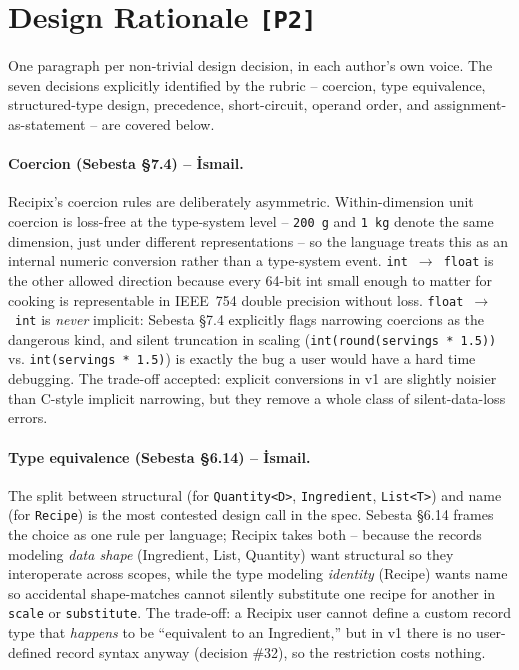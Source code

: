 \documentclass[11pt,a4paper]{article}
\begin{document}
\section{Design Rationale \texttt{[P2]}}

One paragraph per non-trivial design decision, in each author's own
voice. The seven decisions explicitly identified by the rubric --
coercion, type equivalence, structured-type design, precedence,
short-circuit, operand order, and assignment-as-statement -- are
covered below.

\paragraph{Coercion (Sebesta \S7.4) -- İsmail.}
Recipix's coercion rules are deliberately asymmetric. Within-dimension
unit coercion is loss-free at the type-system level -- \texttt{200 g}
and \texttt{1 kg} denote the same dimension, just under different
representations -- so the language treats this as an internal numeric
conversion rather than a type-system event. \texttt{int}~$\to$~\texttt{float}
is the other allowed direction because every 64-bit int small enough to
matter for cooking is representable in IEEE~754 double precision
without loss. \texttt{float}~$\to$~\texttt{int} is \emph{never}
implicit: Sebesta \S7.4 explicitly flags narrowing coercions as the
dangerous kind, and silent truncation in scaling
(\texttt{int(round(servings * 1.5))} vs. \texttt{int(servings * 1.5)})
is exactly the bug a user would have a hard time debugging. The
trade-off accepted: explicit conversions in v1 are slightly noisier
than C-style implicit narrowing, but they remove a whole class of
silent-data-loss errors.

\paragraph{Type equivalence (Sebesta \S6.14) -- İsmail.}
The split between structural (for \texttt{Quantity<D>}, \texttt{Ingredient},
\texttt{List<T>}) and name (for \texttt{Recipe}) is the most contested
design call in the spec. Sebesta \S6.14 frames the choice as one rule
per language; Recipix takes both -- because the records modeling
\emph{data shape} (Ingredient, List, Quantity) want structural so they
interoperate across scopes, while the type modeling \emph{identity}
(Recipe) wants name so accidental shape-matches cannot silently
substitute one recipe for another in \texttt{scale} or \texttt{substitute}.
The trade-off: a Recipix user cannot define a custom record type that
\emph{happens} to be ``equivalent to an Ingredient,'' but in v1 there
is no user-defined record syntax anyway (decision \#32), so the
restriction costs nothing.
\end{document}

